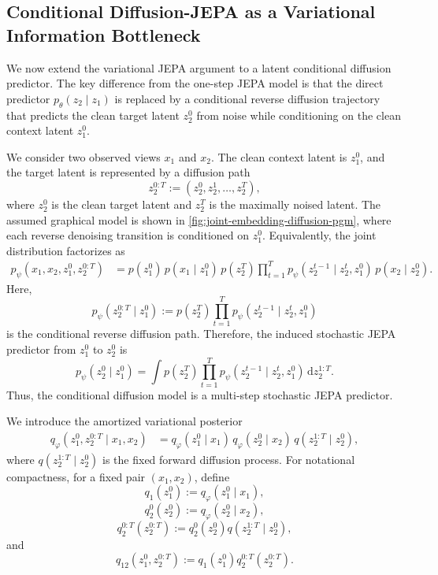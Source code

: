 \documentclass{article}
\begin{document}
\subsection{Conditional Diffusion-JEPA as a Variational Information Bottleneck}
\label{app:conditional-diffusion-jepa-ib}

We now extend the variational JEPA argument to a latent conditional diffusion
predictor. The key difference from the one-step JEPA model is that the direct
predictor $p_\theta(z_2\mid z_1)$ is replaced by a conditional reverse diffusion
trajectory that predicts the clean target latent $z_2^0$ from noise while
conditioning on the clean context latent $z_1^0$.

We consider two observed views $x_1$ and $x_2$. The clean context latent is
$z_1^0$, and the target latent is represented by a diffusion path
\[
z_2^{0:T}:=(z_2^0,z_2^1,\ldots,z_2^T),
\]
where $z_2^0$ is the clean target latent and $z_2^T$ is the maximally noised
latent. The assumed graphical model is shown in \cref{fig:joint-embedding-diffusion-pgm},
where each reverse denoising transition is conditioned on $z_1^0$. Equivalently,
the joint distribution factorizes as
\begin{align}
p_\psi(x_1,x_2,z_1^0,z_2^{0:T})
&=
p(z_1^0)\,
p(x_1\mid z_1^0)\,
p(z_2^T)
\prod_{t=1}^{T}
p_\psi(z_2^{t-1}\mid z_2^t,z_1^0)\,
p(x_2\mid z_2^0).
\label{eq:cdj-factorization-simple}
\end{align}
Here,
\[
p_\psi(z_2^{0:T}\mid z_1^0)
:=
p(z_2^T)
\prod_{t=1}^{T}
p_\psi(z_2^{t-1}\mid z_2^t,z_1^0)
\]
is the conditional reverse diffusion path. Therefore, the induced stochastic
JEPA predictor from $z_1^0$ to $z_2^0$ is
\begin{equation}
p_\psi(z_2^0\mid z_1^0)
=
\int
p(z_2^T)
\prod_{t=1}^{T}
p_\psi(z_2^{t-1}\mid z_2^t,z_1^0)
\,\mathrm{d}z_2^{1:T}.
\label{eq:cdj-implicit-predictor-simple}
\end{equation}
Thus, the conditional diffusion model is a multi-step stochastic JEPA predictor.

We introduce the amortized variational posterior
\begin{align}
q_\varphi(z_1^0,z_2^{0:T}\mid x_1,x_2)
&=
q_\varphi(z_1^0\mid x_1)\,
q_\varphi(z_2^0\mid x_2)\,
q(z_2^{1:T}\mid z_2^0),
\label{eq:cdj-variational-posterior-simple}
\end{align}
where $q(z_2^{1:T}\mid z_2^0)$ is the fixed forward diffusion process. For
notational compactness, for a fixed pair $(x_1,x_2)$, define
\[
q_1(z_1^0):=q_\varphi(z_1^0\mid x_1),
\]
\[
q_2^0(z_2^0):=q_\varphi(z_2^0\mid x_2),
\]
\[
q_2^{0:T}(z_2^{0:T})
:=
q_2^0(z_2^0)q(z_2^{1:T}\mid z_2^0),
\]
and
\[
q_{12}(z_1^0,z_2^{0:T})
:=
q_1(z_1^0)q_2^{0:T}(z_2^{0:T}).
\]
\end{document}
